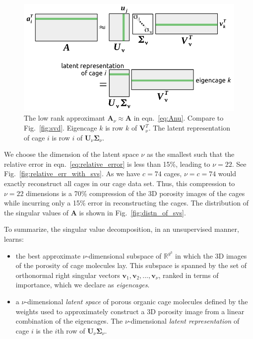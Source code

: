 \documentclass[journal=jacsat,manuscript=article,layout=traditional]{achemso}
\begin{document}
\begin{figure}
\centering
	\includegraphics[width=0.75\columnwidth]{svd_approx-crop.pdf}
	\caption{The low rank approximant $\mathbf{A}_\nu \approx \mathbf{A}$ in eqn.~\ref{eq:Anu}. Compare to Fig.~\ref{fig:svd}. Eigencage $k$ is row $k$ of $\mathbf{V}_\nu^T$. The latent representation of cage $i$ is row $i$ of $\mathbf{U}_\nu \mathbf{\Sigma}_\nu$.
	} \label{fig:svd_approx}
\end{figure}

We choose the dimension of the latent space $\nu$ as the smallest such that the relative error in eqn.~\ref{eq:relative_error} is less than 15\%, leading to $\nu=22$. See Fig.~\ref{fig:relative_err_with_svs}. As we have $c=74$ cages, $\nu=c=74$ would exactly reconstruct all cages in our cage data set. Thus, this compression to $\nu=22$ dimensions is a 70\% compression of the 3D porosity images of the cages while incurring only a 15\% error in reconstructing the cages. The distribution of the singular values of $\mathbf{A}$ is shown in Fig.~\ref{fig:distn_of_svs}.

To summarize, the singular value decomposition, in an unsupervised manner, learns:
\begin{itemize}
\item the best approximate $\nu$-dimensional subspace of $\mathbb{R}^{g^3}$ in which the 3D images of the porosity of cage molecules lay. This subspace is spanned by the set of orthonormal right singular vectors $\mathbf{v}_1, \mathbf{v}_2, ..., \mathbf{v}_\nu$, ranked in terms of importance, which we declare as \emph{eigencages}.
\item a $\nu$-dimensional \emph{latent space} of porous organic cage molecules defined by the weights used to approximately construct a 3D porosity image from a linear combination of the eigencages. The $\nu$-dimensional \emph{latent representation} of cage $i$ is the $i$th row of $\mathbf{U}_\nu \mathbf{\Sigma}_\nu$.
\end{itemize}
\end{document}
